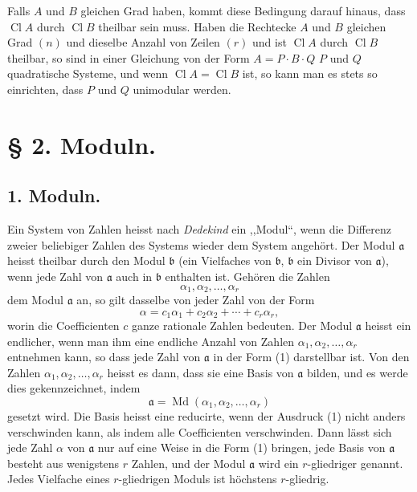 \documentclass[11pt,a4paper]{article}
\newcommand{\Cl}{\operatorname{Cl}}
\newcommand{\Md}{\operatorname{Md}}
\begin{document}
Falls $A$ und $B$ gleichen Grad haben, kommt diese Bedingung darauf hinaus, dass $\Cl A$ durch $\Cl B$ theilbar sein muss. Haben die Rechtecke $A$ und $B$ gleichen Grad $(n)$ und dieselbe Anzahl von Zeilen $(r)$ und ist $\Cl A$ durch $\Cl B$ theilbar, so sind in einer Gleichung von der Form $A=P\cdot B\cdot Q$ $P$ und $Q$ quadratische Systeme, und wenn $\Cl A=\Cl B$ ist, so kann man es stets so einrichten, dass $P$ und $Q$ unimodular werden.

\section*{§ 2. Moduln.}

\subsection*{1. Moduln.}

Ein System von Zahlen heisst nach \emph{Dedekind} ein ,,Modul``, wenn die Differenz zweier beliebiger Zahlen des Systems wieder dem System angehört. Der Modul $\mathfrak a$ heisst theilbar durch den Modul $\mathfrak b$ (ein Vielfaches von $\mathfrak b$, $\mathfrak b$ ein Divisor von $\mathfrak a$), wenn jede Zahl von $\mathfrak a$ auch in $\mathfrak b$ enthalten ist. Gehören die Zahlen
\[
 \alpha_1,\alpha_2,\ldots,\alpha_r
\]
dem Modul $\mathfrak a$ an, so gilt dasselbe von jeder Zahl von der Form
\begin{equation}
 \alpha=c_1\alpha_1+c_2\alpha_2+\cdots+c_r\alpha_r,
\tag{1}
\end{equation}
worin die Coefficienten $c$ ganze rationale Zahlen bedeuten. Der Modul $\mathfrak a$ heisst ein endlicher, wenn man ihm eine endliche Anzahl von Zahlen $\alpha_1,\alpha_2,\ldots,\alpha_r$ entnehmen kann, so dass jede Zahl von $\mathfrak a$ in der Form (1) darstellbar ist. Von den Zahlen $\alpha_1,\alpha_2,\ldots,\alpha_r$ heisst es dann, dass sie eine Basis von $\mathfrak a$ bilden, und es werde dies gekennzeichnet, indem
\[
 \mathfrak a=\Md(\alpha_1,\alpha_2,\ldots,\alpha_r)
\]
gesetzt wird. Die Basis heisst eine reducirte, wenn der Ausdruck (1) nicht anders verschwinden kann, als indem alle Coefficienten verschwinden. Dann lässt sich jede Zahl $\alpha$ von $\mathfrak a$ nur auf eine Weise in die Form (1) bringen, jede Basis von $\mathfrak a$ besteht aus wenigstens $r$ Zahlen, und der Modul $\mathfrak a$ wird ein $r$-gliedriger genannt. Jedes Vielfache eines $r$-gliedrigen Moduls ist höchstens $r$-gliedrig.
\end{document}
